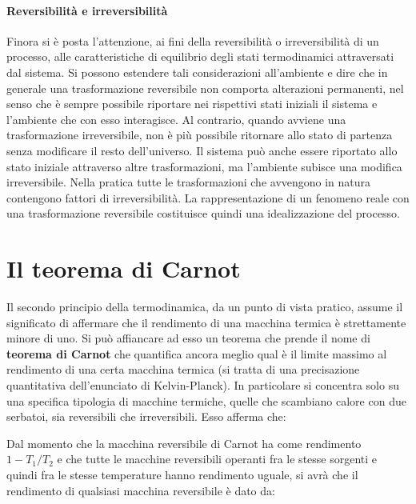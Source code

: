 \paragraph{Reversibilità e irreversibilità} Finora si è posta l'attenzione, ai fini della reversibilità o irreversibilità di un processo, alle caratteristiche di equilibrio degli stati termodinamici attraversati dal sistema. Si possono estendere tali considerazioni all'ambiente e dire che in generale una trasformazione reversibile non comporta alterazioni permanenti, nel senso che è sempre possibile riportare nei rispettivi stati iniziali il sistema e l'ambiente che con esso interagisce. Al contrario, quando avviene una trasformazione irreversibile, non è più possibile ritornare allo stato di partenza senza modificare il resto dell'universo. Il sistema può anche essere riportato allo stato iniziale attraverso altre trasformazioni, ma l'ambiente subisce una modifica irreversibile. Nella pratica tutte le trasformazioni che avvengono in natura contengono fattori di irreversibilità. La rappresentazione di un fenomeno reale con una trasformazione reversibile costituisce quindi una idealizzazione del processo.

\section{Il teorema di Carnot}

Il secondo principio della termodinamica, da un punto di vista pratico, assume il significato di affermare che il rendimento di una macchina termica è strettamente minore di uno. Si può affiancare ad esso un teorema che prende il nome di \textbf{teorema di Carnot} che quantifica ancora meglio qual è il limite massimo al rendimento di una certa macchina termica (si tratta di una precisazione quantitativa dell'enunciato di Kelvin-Planck). In particolare si concentra solo su una specifica tipologia di macchine termiche, quelle che scambiano calore con due serbatoi, sia reversibili che irreversibili. Esso afferma che:

\noindent{}

Dal momento che la macchina reversibile di Carnot ha come rendimento $1-T_1/T_2$ e che tutte le macchine reversibili operanti fra le stesse sorgenti e quindi fra le stesse temperature hanno rendimento uguale, si avrà che il rendimento di qualsiasi macchina reversibile è dato da:

